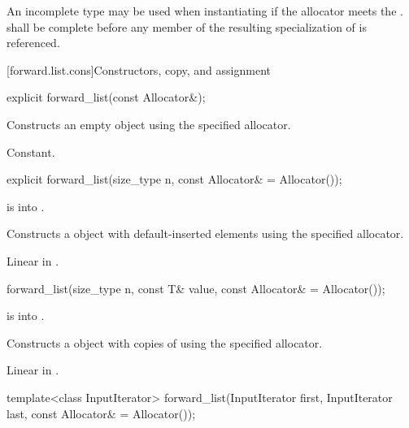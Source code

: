 \pnum
An incomplete type  may be used when instantiating 
if the allocator meets the
.
 shall be complete before any member of the resulting specialization
of  is referenced.

[forward.list.cons]{Constructors, copy, and assignment}

%
\begin{itemdecl}
explicit forward_list(const Allocator&);
\end{itemdecl}

\begin{itemdescr}
\pnum
\effects
Constructs an empty  object using the specified allocator.

\pnum
\complexity
Constant.
\end{itemdescr}

%
\begin{itemdecl}
explicit forward_list(size_type n, const Allocator& = Allocator());
\end{itemdecl}

\begin{itemdescr}
\pnum
\expects
{} is  into .

\pnum
\effects
Constructs a  object with 
default-inserted elements using the specified allocator.

\pnum
\complexity
Linear in .
\end{itemdescr}

%
\begin{itemdecl}
forward_list(size_type n, const T& value, const Allocator& = Allocator());
\end{itemdecl}

\begin{itemdescr}
\pnum
\expects
{} is  into .

\pnum
\effects
Constructs a  object with  copies of  using the specified allocator.

\pnum
\complexity
Linear in .
\end{itemdescr}

%
\begin{itemdecl}
template<class InputIterator>
  forward_list(InputIterator first, InputIterator last, const Allocator& = Allocator());
\end{itemdecl}

